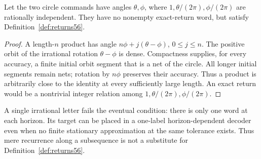 \begin{proposition}\label{prop:approxreturns56}
Let the two circle commands have angles $\theta,\phi$, where $1,\theta/(2\pi),\phi/(2\pi)$ are rationally independent. They have no nonempty exact-return word, but satisfy Definition~\ref{def:returns56}.
\end{proposition}
\begin{proof}
A length-$n$ product has angle $n\phi+j(\theta-\phi)$, $0\le j\le n$. The positive orbit of the irrational rotation $\theta-\phi$ is dense. Compactness supplies, for every accuracy, a finite initial orbit segment that is a net of the circle. All longer initial segments remain nets; rotation by $n\phi$ preserves their accuracy. Thus a product is arbitrarily close to the identity at every sufficiently large length. An exact return would be a nontrivial integer relation among $1,\theta/(2\pi),\phi/(2\pi)$.
\end{proof}
A single irrational letter fails the eventual condition: there is only one word at each horizon. Its target can be placed in a one-label horizon-dependent decoder even when no finite stationary approximation at the same tolerance exists. Thus mere recurrence along a subsequence is not a substitute for Definition~\ref{def:returns56}.
